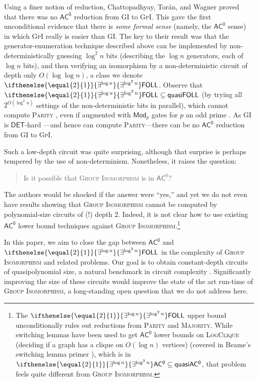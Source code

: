 \documentclass{article}
\newcommand{\algprobm}[1]{\textsc{#1}\xspace}
\newcommand{\betacc}[1]{\ifthenelse{\equal{#1}{1}}{\exists^{\log n}}{\exists^{\log^{#1}n}}} %
\newcommand*{\ComplexityClass}[1]{\ensuremath{\mathsf{#1}}\xspace}
\newcommand{\ACz}{\ComplexityClass{AC^0}}
\newcommand{\qACz}{\ComplexityClass{quasiAC^0}}
\newcommand{\FOLL}{\ComplexityClass{FOLL}}
\begin{document}
Using a finer notion of reduction, Chattopadhyay, Torán, and Wagner \cite{ChattopadhyayToranWagner} proved that there was no $\ACz$ reduction from \algprobm{GI} to \algprobm{GpI}. This gave the first unconditional evidence that there is \emph{some formal sense} (namely, the $\ACz$ sense) in which \algprobm{GpI} really is easier than \algprobm{GI}. The key to their result was that the generator-enumeration technique described above can be implemented by non-deterministically guessing $\log^2 n$ bits (describing the $\log n$ generators, each of $\log n$ bits), and then verifying an isomorphism by a non-deterministic circuit of depth only $O(\log \log n)$, 
a class we denote $\betacc{2}\FOLL$. Observe that $\betacc{2}\FOLL \subseteq \mathsf{quasiFOLL}$ (by trying all $2^{O(\log^2 n)}$ settings of the non-deterministic bits in parallel), which cannot compute \algprobm{Parity} \cite{Hastad}, even if augmented with $\mathsf{Mod}_p$ gates for $p$ an odd prime \cite{Razborov, Smolensky87algebraicmethods, ChattopadhyayToranWagner}.  As \algprobm{GI} is $\mathsf{DET}$-hard \cite{Toran}---and hence can compute \algprobm{Parity}---there can be no $\ACz$ reduction from \algprobm{GI} to \algprobm{GpI}.

Such a low-depth circuit was quite surprising, although that surprise is perhaps tempered by the use of non-determinism. Nonetheless, it raises the question: 

\begin{quotation}
\noindent Is it possible that \algprobm{Group Isomorphism} is in $\mathsf{AC}^0$?
\end{quotation}

\noindent The authors would be shocked if the answer were ``yes,'' and yet we do not even have results showing that \algprobm{Group Isomorphism} cannot be computed by polynomial-size circuits of (!) depth 2. Indeed, it is not clear how to use existing $\ACz$ lower bound techniques against \algprobm{Group Isomorphism}.\footnote{The $\betacc{2}\FOLL$ upper bound unconditionally rules out reductions from \algprobm{Parity} and \algprobm{Majority}. While switching lemmas have been used to get $\ACz$ lower bounds on \algprobm{LogClique} (deciding if a graph has a clique on $O(\log n)$ vertices) \cite{lynch, Beame1990, RossmanClique} (covered in Beame's switching lemma primer \cite{BeamePrimer}), which is in $\betacc{2}\ACz \subseteq \qACz$, that problem feels quite different from \algprobm{Group Isomorphism}.}

In this paper, we aim to close the gap between $\ACz$ and $\betacc{2}\FOLL$ in the complexity of \algprobm{Group Isomorphism} and related problems. 
Our goal is to obtain constant-depth circuits of quasipolynomial size, a natural benchmark in circuit complexity \cite{BarringtonQuasipolynomial}. Significantly improving the size of these circuits would improve the state of the art run-time of \algprobm{Group Isomorphism}, a long-standing open question that we do not address here.
\end{document}
